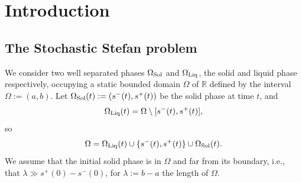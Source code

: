 \documentclass[reqno]{amsart}
\numberwithin{equation}{section}
\begin{document}

\maketitle
\pagestyle{myheadings}
%
\thispagestyle{plain}
%
%

\section{Introduction}
\subsection{The Stochastic Stefan problem}
We consider two well separated phases $\Omega_{{\rm Sol}}$ and $\Omega_{{\rm Liq}}$, the solid and liquid phase respectively, occupying a static bounded domain $\Omega$ of $\mathbb{R}$ defined
by the interval $\Omega:=(a,b)$. Let $\Omega_{{\rm Sol}}(t):=(s^-(t),s^+(t))$ be the solid phase at time $t$, and
\begin{equation}\label{lam}
\Omega_{{\rm Liq}}(t) = \Omega\setminus [s^-(t), s^+(t)] ,
\end{equation}
so
$$\Omega=\Omega_{{\rm Liq}}(t)\cup \{s^-(t),s^+(t)\}\cup \Omega_{{\rm Sol}}(t) . %
$$
We assume that the initial solid phase is in $\Omega$ and far from its boundary, i.e., that $\lambda\gg s^+(0)-s^-(0)$, for $\lambda:=b-a$ the length of $\Omega$.
\end{document}
